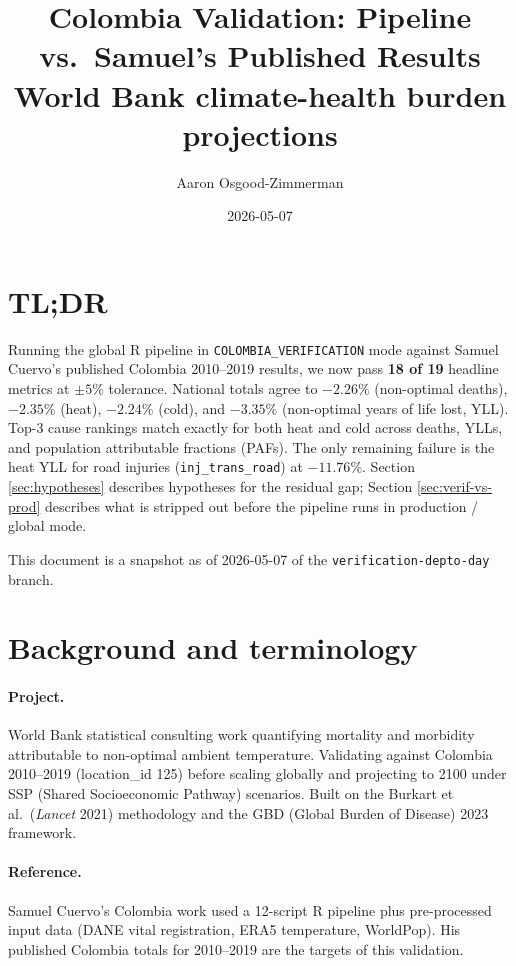 \documentclass[11pt]{article}
\title{Colombia Validation: Pipeline vs.\ Samuel's Published Results\\
\large World Bank climate-health burden projections}
\author{Aaron Osgood-Zimmerman}
\date{2026-05-07}
\begin{document}
\maketitle

\section*{TL;DR}

Running the global R pipeline in \texttt{COLOMBIA\_VERIFICATION} mode against
Samuel Cuervo's published Colombia 2010--2019 results, we now pass
\textbf{18 of 19} headline metrics at $\pm 5\%$ tolerance. National totals
agree to $-2.26\%$ (non-optimal deaths), $-2.35\%$ (heat), $-2.24\%$ (cold),
and $-3.35\%$ (non-optimal years of life lost, YLL). Top-3 cause rankings
match exactly for both heat and cold across deaths, YLLs, and population
attributable fractions (PAFs). The only remaining failure is the heat YLL
for road injuries (\texttt{inj\_trans\_road}) at $-11.76\%$. Section
\ref{sec:hypotheses} describes hypotheses for the residual gap; Section
\ref{sec:verif-vs-prod} describes what is stripped out before the pipeline
runs in production / global mode.

This document is a snapshot as of 2026-05-07 of the
\texttt{verification-depto-day} branch.

\section{Background and terminology}

\paragraph{Project.} World Bank statistical consulting work quantifying
mortality and morbidity attributable to non-optimal ambient temperature.
Validating against Colombia 2010--2019 (location\_id 125) before scaling
globally and projecting to 2100 under SSP (Shared Socioeconomic Pathway)
scenarios. Built on the Burkart et al.\ (\textit{Lancet} 2021) methodology
and the GBD (Global Burden of Disease) 2023 framework.

\paragraph{Reference.} Samuel Cuervo's Colombia work used a 12-script R
pipeline plus pre-processed input data (DANE vital registration, ERA5
temperature, WorldPop). His published Colombia totals for 2010--2019 are
the targets of this validation.
\end{document}
